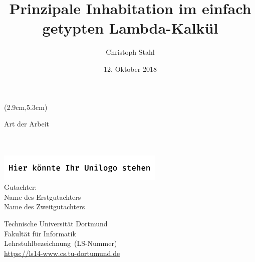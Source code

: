 \documentclass[paper=a4,fontsize=11pt,BCOR=20mm,toc=bib,twoside, DIV=12, headsepline, open=right,ngerman,rgb,listof=totoc]{scrreprt}
\title{Prinzipale Inhabitation im einfach\\getypten Lambda-Kalkül}
\author{Christoph Stahl}
\date{12. Oktober 2018}
\newcommand{\thethesistype}{Art der Arbeit}
\newcommand{\thefirstsupervisor}{Name des Erstgutachters}
\newcommand{\thesecondsupervisor}{Name des Zweitgutachters}
\newcommand{\thechair}{Lehrstuhlbezeichnung}
\newcommand{\thechairshort}{LS-Nummer}
\newcommand{\thechairurl}{https://ls14-www.cs.tu-dortumund.de}
\begin{document}
\makeatletter
\begin{titlepage}
\sffamily
\begin{textblock*}{9.1cm}(2.9cm,5.3cm)
\noindent
\begin{center}
\begin{minipage}[t][8.8cm][c]{8.7cm}    
\begin{center}
\large
{\Large \thethesistype}\\[1cm]
\textbf{\@title}\\[1cm]
\@author\\
\@date
\end{center}
\end{minipage}
\end{center}
\end{textblock*}
\noindent\includegraphics[width=8cm]{tud_logo_rgba}\\[\fill]
\noindent Gutachter:\\
\thefirstsupervisor\\
\thesecondsupervisor\\[2.5cm]
\begin{minipage}[b]{.55\textwidth}
Technische Universität Dortmund\\
Fakultät für Informatik\\
\thechair~(\thechairshort)\\
\url{\thechairurl}
\end{minipage}\hfill
\end{titlepage}
\end{document}
